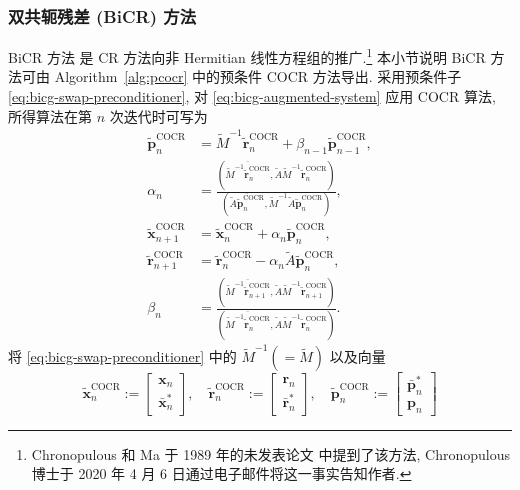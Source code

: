 \subsubsection{{双共轭残差 (BiCR) 方法}}\label{subsec:bicr-method}
{BiCR 方法  是 CR 方法向非 Hermitian 线性方程组的推广.}\footnote{{Chronopulous 和 Ma 于 1989 年的未发表论文  中提到了该方法, Chronopulous 博士于 2020 年 4 月 6 日通过电子邮件将这一事实告知作者.}}
{本小节说明 BiCR 方法可由 Algorithm\ \ref{alg:pcocr} 中的预条件 COCR 方法导出. 采用预条件子 \eqref{eq:bicg-swap-preconditioner}, 对 \eqref{eq:bicg-augmented-system} 应用 COCR 算法, 所得算法在第 $n$ 次迭代时可写为}
\[\begin{aligned}
\widetilde{\bm p}_n^{\mathrm{COCR}}&=\widetilde M^{-1}\widetilde{\bm r}_n^{\mathrm{COCR}}+\beta_{n-1}\widetilde{\bm p}_{n-1}^{\mathrm{COCR}},\\
\alpha_n&=\frac{(\overline{\widetilde M^{-1}\widetilde{\bm r}_n^{\mathrm{COCR}}},\widetilde A\widetilde M^{-1}\widetilde{\bm r}_n^{\mathrm{COCR}})}{(\overline{\widetilde A\widetilde{\bm p}_n^{\mathrm{COCR}}},\widetilde M^{-1}\widetilde A\widetilde{\bm p}_n^{\mathrm{COCR}})},\\
\widetilde{\bm x}_{n+1}^{\mathrm{COCR}}&=\widetilde{\bm x}_n^{\mathrm{COCR}}+\alpha_n\widetilde{\bm p}_n^{\mathrm{COCR}},\\
\widetilde{\bm r}_{n+1}^{\mathrm{COCR}}&=\widetilde{\bm r}_n^{\mathrm{COCR}}-\alpha_n\widetilde A\widetilde{\bm p}_n^{\mathrm{COCR}},\\
\beta_n&=\frac{(\overline{\widetilde M^{-1}\widetilde{\bm r}_{n+1}^{\mathrm{COCR}}},\widetilde A\widetilde M^{-1}\widetilde{\bm r}_{n+1}^{\mathrm{COCR}})}{(\overline{\widetilde M^{-1}\widetilde{\bm r}_n^{\mathrm{COCR}}},\widetilde A\widetilde M^{-1}\widetilde{\bm r}_n^{\mathrm{COCR}})}.
\end{aligned}\]
{将 \eqref{eq:bicg-swap-preconditioner} 中的 $\widetilde M^{-1}(=\widetilde M)$ 以及向量}
\[\widetilde{\bm x}_n^{\mathrm{COCR}}:=\begin{bmatrix}\bm x_n\\\bar{\bm x}_n^{*}\end{bmatrix},\quad\widetilde{\bm r}_n^{\mathrm{COCR}}:=\begin{bmatrix}\bm r_n\\\bar{\bm r}_n^{*}\end{bmatrix},\quad\widetilde{\bm p}_n^{\mathrm{COCR}}:=\begin{bmatrix}\bar{\bm p}_n^{*}\\\bm p_n\end{bmatrix}\]
